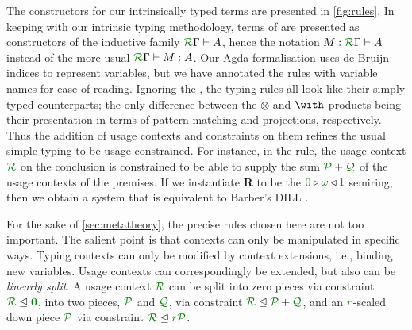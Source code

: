 \documentclass[submission,copyright,creativecommons]{eptcs}
\begin{document}


The constructors for our intrinsically typed terms are presented in \autoref{fig:rules}.
In keeping with our intrinsic typing methodology, terms of \name{} are presented as constructors of the inductive family $\ctx\Gamma{R} \vdash A$, hence the notation $M : \ctx\Gamma{R} \vdash A$ instead of the more usual $\ctx\Gamma{R} \vdash M : A$. 
Our Agda formalisation uses de Bruijn indices to represent variables, but we have annotated the rules with variable names for ease of reading. 
Ignoring the , the typing rules all look like their
simply typed counterparts; the only difference between the $\otimes$
and $\with$ products being their presentation in terms of pattern
matching and projections, respectively.
Thus the addition of usage contexts and constraints on them refines the usual simple typing to be usage constrained.
For instance, in the  rule, the usage context $\resctx R$ on the conclusion is constrained to be able to supply the sum $\resctx P + \resctx Q$ of the usage contexts of the premises.
If we instantiate $\mathbf R$ to be the
$\zero \triangleright \unrestricted \triangleleft \linear$ semiring, then we
obtain a system that is equivalent to Barber's DILL \cite{Barber1996}.

For the sake of \autoref{sec:metatheory}, the precise rules chosen here are
not too important.
The salient point is that contexts can only be manipulated in specific ways.
Typing contexts can only be modified by context extensions, i.e., binding new
variables.
Usage contexts can correspondingly be extended, but also can be
\emph{linearly split}.
A usage context $\resctx R$ can be split into zero pieces via constraint
$\resctx R \subres \rescomment{\vct 0}$, into two pieces, $\resctx P$ and
$\resctx Q$, via constraint $\resctx R \subres \resctx P + \resctx Q$, and an
$\rescomment r$-scaled down piece $\resctx P$ via constraint
$\resctx R \subres \rescomment r\resctx P$.
\end{document}
